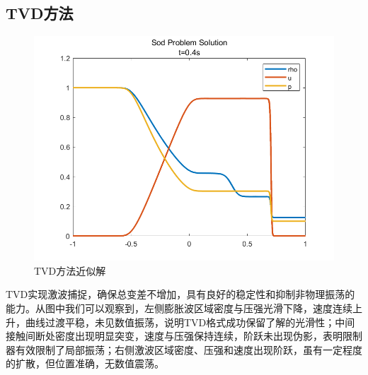 \documentclass[12pt,a4paper]{article}%
\begin{document}
		\subsection{TVD方法}
		\begin{figure}[H]
			\centering
			\begin{minipage}{1\textwidth}
				\centering
				\includegraphics[width=\textwidth]{./fig/app3.png}
				\caption{\fontsize{10pt}{15pt}\selectfont TVD方法近似解}
			\end{minipage}
		\end{figure}
		TVD实现激波捕捉，确保总变差不增加，具有良好的稳定性和抑制非物理振荡的能力。从图中我们可以观察到，左侧膨胀波区域密度与压强光滑下降，速度连续上升，曲线过渡平稳，未见数值振荡，说明TVD格式成功保留了解的光滑性；中间接触间断处密度出现明显突变，速度与压强保持连续，阶跃未出现伪影，表明限制器有效限制了局部振荡；右侧激波区域密度、压强和速度出现阶跃，虽有一定程度的扩散，但位置准确，无数值震荡。
			
\end{document}
